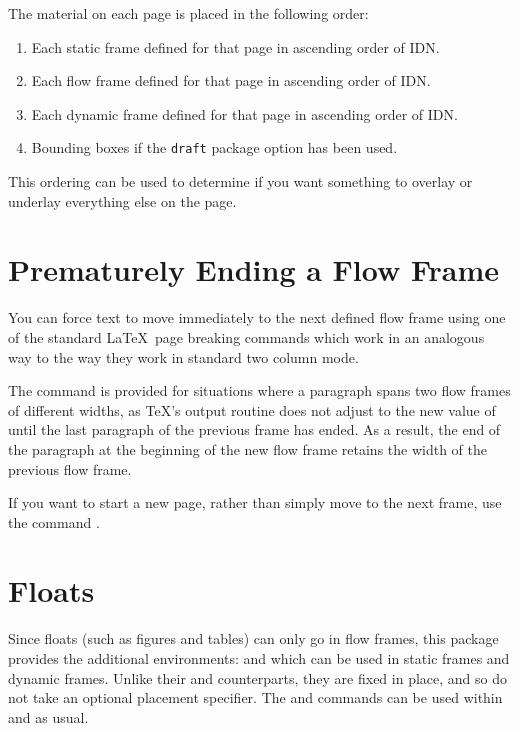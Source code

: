 \documentclass{article}
\begin{document}
The material on each page is placed in the following order:
\begin{enumerate}
\item Each static frame defined for that page in ascending
order of IDN.

\item Each flow frame defined for that page in ascending
order of IDN.

\item Each dynamic frame defined for that page in ascending
order of IDN.

\item {Bounding boxes} if the \texttt{draft}
package option has been used.
\end{enumerate}

This ordering can be used to determine if you want something
to overlay or underlay everything else on the page.

\section*{Prematurely Ending a Flow Frame}

You can force text to move immediately to the next defined
flow frame using one of the standard \LaTeX\ page breaking commands
which  work in an analogous way to the way they
work in standard two column mode.

The command  is provided for situations
where a paragraph spans two flow frames
of different widths, as \TeX's output routine does not
adjust to the new value of  until the last
paragraph of the previous frame has ended. As a
result, the end of the paragraph at the beginning of the new
flow frame retains the width of the previous flow frame.

If you want to start a new page, rather than simply move to the
next frame, use the command\newline
{}.

\section*{Floats}

Since floats (such as figures and tables) can only go in
{flow frames}, this package provides
the additional environments:
 and
 which can be used in static frames
and dynamic frames. Unlike their  and
 counterparts, they are fixed in place, and
so do not take an optional placement specifier. The
 and  commands can
be used within  and  as
usual.
\end{document}
